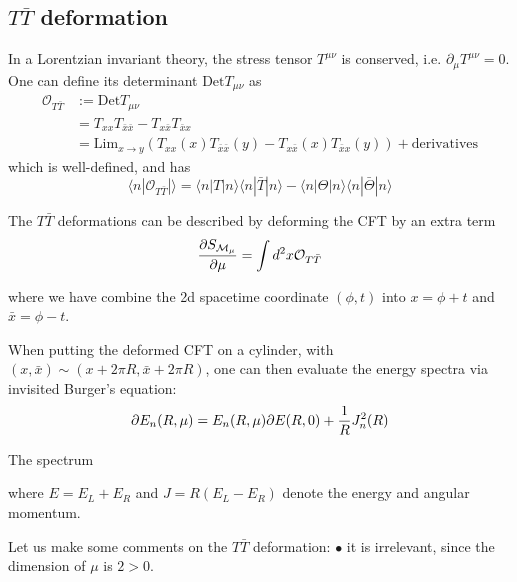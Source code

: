 \documentclass[11pt,a4paper]{article}
\begin{document}
\subsection{$T\bar{T}$ deformation}
In a Lorentzian invariant theory, the stress tensor $T^{\mu\nu}$ is conserved, i.e. $\partial_\mu T^{\mu\nu}=0$. One can define its determinant $\text{Det} T_{\mu\nu}$ as 
\begin{equation}
\begin{split}
    \mathcal O_{T\bar T}&:= \text{Det} T_{\mu\nu} \\
    &=T_{xx}T_{\bar x\bar x}-T_{x\bar x}T_{\bar{x} x} \\
    &=\text{Lim}_{x \rightarrow y} (T_{xx}(x)T_{\bar x\bar x}(y)-T_{x\bar x}(x)T_{\bar{x} x}(y) )+ \text{derivatives}
    \end{split}
\end{equation}
which is well-defined, and has 
\begin{equation}
    \langle n| \mathcal{O}_{T\bar T} |\rangle =\langle n| T |n\rangle \langle n|\bar T |n\rangle -\langle n| 
    \Theta|n\rangle \langle n|\bar{\Theta} |n\rangle
\end{equation}

The $T\bar T$ deformations can be described by deforming the CFT by an extra term 
\begin{equation}
     \frac{\partial S_{\mathcal M_\mu}}{\partial \mu} = \int d^2x \mathcal{O}_{T\bar T}
\end{equation}

where we have combine the 2d spacetime coordinate $(\phi, t)$ into  $x=\phi+t$ and $\bar{x}=\phi-t$.

When putting the deformed CFT on a cylinder, with $(x, \bar x) \sim (x+ 2\pi R, \bar x+2\pi R)$, one can then evaluate the energy spectra via invisited Burger's equation:
\begin{equation}
    \partial E_n(R, \mu)= E_n(R, \mu) \partial E(R, 0)+\frac 1{R} J_n^2(R)
\end{equation}

The spectrum 

where $E = E_L + E_R$ and $J = R(E_L - E_R)$ denote the energy and angular momentum.  

Let us make some comments on the $T\bar T$ deformation:
$\bullet$ it is irrelevant, since the dimension of $\mu$ is $2>0$. 
\end{document}
